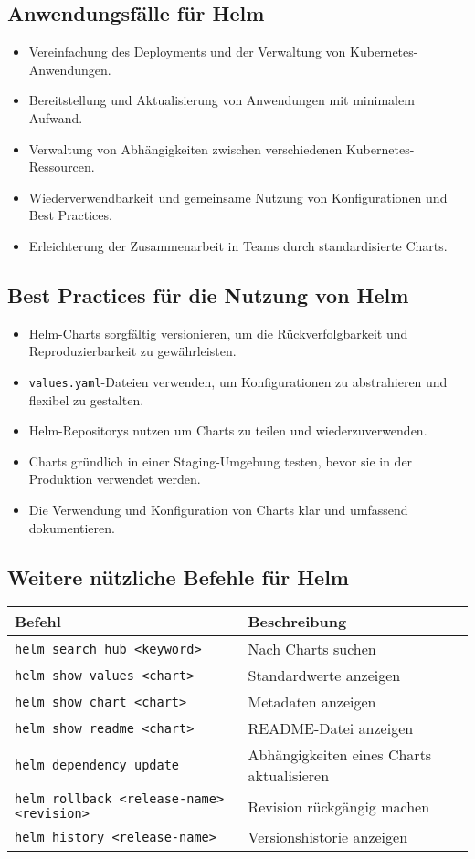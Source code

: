 \subsection{Anwendungsfälle für Helm}
\begin{itemize}
    \item Vereinfachung des Deployments und der Verwaltung von Kubernetes-Anwendungen.
    \item Bereitstellung und Aktualisierung von Anwendungen mit minimalem Aufwand.
    \item Verwaltung von Abhängigkeiten zwischen verschiedenen Kubernetes-Ressourcen.
    \item Wiederverwendbarkeit und gemeinsame Nutzung von Konfigurationen und Best Practices.
    \item Erleichterung der Zusammenarbeit in Teams durch standardisierte Charts.
\end{itemize}

\subsection{Best Practices für die Nutzung von Helm}
\begin{itemize}
    \item Helm-Charts sorgfältig versionieren, um die Rückverfolgbarkeit und Reproduzierbarkeit zu gewährleisten.
    \item \texttt{values.yaml}-Dateien verwenden, um Konfigurationen zu abstrahieren und flexibel zu gestalten.
    \item Helm-Repositorys nutzen um Charts zu teilen und wiederzuverwenden.
    \item Charts gründlich in einer Staging-Umgebung testen, bevor sie in der Produktion verwendet werden.
    \item Die Verwendung und Konfiguration von Charts klar und umfassend dokumentieren.
\end{itemize}

\subsection{Weitere nützliche Befehle für Helm}
\begin{tabular}{
|p{}|p{}|}
\hline
\textbf{Befehl} & \textbf{Beschreibung} \\
\hline
\texttt{helm search hub <keyword>} & Nach Charts suchen \\
\texttt{helm show values <chart>} & Standardwerte anzeigen \\
\texttt{helm show chart <chart>} & Metadaten anzeigen \\
\texttt{helm show readme <chart>} & README-Datei anzeigen \\
\texttt{helm dependency update} & Abhängigkeiten eines Charts aktualisieren \\
\texttt{helm rollback <release-name> <revision>} & Revision rückgängig machen \\
\texttt{helm history <release-name>} & Versionshistorie anzeigen \\
\hline
\end{tabular}

